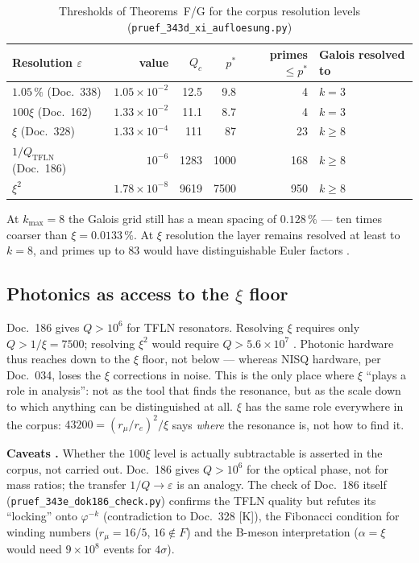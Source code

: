 \begin{table}[H]
\centering
\caption{Thresholds of Theorems~F/G for the corpus resolution levels
  (\texttt{pruef\_343d\_xi\_aufloesung.py})}
\begin{tabular}{lrrrrl}
\toprule
Resolution $\varepsilon$ & value & $Q_c$ & $p^*$ & primes $\leq p^*$ & Galois resolved to \\
\midrule
$1.05\,\%$ (Doc.~338) & $1.05\times10^{-2}$ & 12.5 & 9.8 & 4 & $k=3$ \\
$100\xi$ (Doc.~162) & $1.33\times10^{-2}$ & 11.1 & 8.7 & 4 & $k=3$ \\
$\xi$ (Doc.~328) & $1.33\times10^{-4}$ & 111 & 87 & 23 & $k\geq 8$ \\
$1/Q_\mathrm{TFLN}$ (Doc.~186) & $10^{-6}$ & 1283 & 1000 & 168 & $k\geq 8$ \\
$\xi^2$ & $1.78\times10^{-8}$ & 9619 & 7500 & 950 & $k\geq 8$ \\
\bottomrule
\end{tabular}
\end{table}

At $k_\mathrm{max}=8$ the Galois grid still has a mean spacing of $0.128\,\%$
--- ten times coarser than $\xi=0.0133\,\%$. At $\xi$ resolution the layer
remains resolved at least to $k=8$, and primes up to $83$ would have
distinguishable Euler factors \BM.

\subsection{Photonics as access to the $\xi$ floor}

Doc.~186 gives $Q>10^6$ for TFLN resonators. Resolving $\xi$ requires only
$Q>1/\xi=7500$; resolving $\xi^2$ would require $Q>5.6\times10^7$ \BM. Photonic
hardware thus reaches down to the $\xi$ floor, not below --- whereas NISQ
hardware, per Doc.~034, loses the $\xi$ corrections in noise. This is the only
place where $\xi$ ``plays a role in analysis'': not as the tool that finds the
resonance, but as the scale down to which anything can be distinguished at all.
$\xi$ has the same role everywhere in the corpus: $43200=(r_\mu/r_e)^2/\xi$
says \emph{where} the resonance is, not how to find it.

\textbf{Caveats \SM.} Whether the $100\xi$ level is actually subtractable is
asserted in the corpus, not carried out. Doc.~186 gives $Q>10^6$ for the optical
phase, not for mass ratios; the transfer $1/Q\to\varepsilon$ is an analogy. The
check of Doc.~186 itself (\texttt{pruef\_343e\_dok186\_check.py}) confirms the
TFLN quality but refutes its ``locking'' onto $\varphi^{-k}$ (contradiction to
Doc.~328 [K]), the Fibonacci condition for winding numbers ($r_\mu=16/5$,
$16\notin F$) and the B-meson interpretation ($\alpha=\xi$ would need
$9\times10^8$ events for $4\sigma$).

